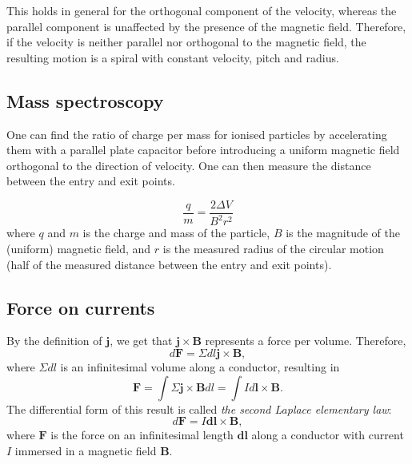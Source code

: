 \documentclass[a4paper, 12pt]{article}
\renewcommand{\vec}[1]{\mathbf{#1}}
\renewcommand{\j}{\ensuremath{\vec{j}}}
\newcommand{\B}{\ensuremath{\vec{B}}}
\begin{document}
        This holds in general for the orthogonal component of the velocity, whereas the parallel component is unaffected by the presence of the magnetic field. 
        Therefore, if the velocity is neither parallel nor orthogonal to the magnetic field, the resulting motion is a spiral with constant velocity, pitch and radius.
        
    \subsection{Mass spectroscopy}
        One can find the ratio of charge per mass for ionised particles by accelerating them with a parallel plate capacitor before introducing a uniform magnetic field orthogonal to the direction of velocity. One can then measure the distance between the entry and exit points.
        
        \begin{equation}
            \frac{q}{m} = \frac{2 \Delta V}{B^2 r^2}
        \end{equation}
        where $q$ and $m$ is the charge and mass of the particle, $B$ is the magnitude of the (uniform) magnetic field, and $r$ is the measured radius of the circular motion (half of the measured distance between the entry and exit points).
        
    \subsection{Force on currents}
        By the definition of \j, we get that $\j \times \B$ represents a force per volume. Therefore, 
        \begin{equation}
            d\vec{F} = \Sigma dl \j \times \B, 
        \end{equation}
        where $\Sigma dl$ is an infinitesimal volume along a conductor, resulting in 
        \begin{equation}
            \vec{F} = \int \Sigma \j \times \B dl = \int I d\vec{l} \times \B.
        \end{equation}
        The differential form of this result is called \textit{the second Laplace elementary law}:
        \begin{equation}
            d\vec{F} = I\vec{dl} \times \B,
        \end{equation}
        where $\vec{F}$ is the force on an infinitesimal length $\vec{dl}$ along a conductor with current $I$ immersed in a magnetic field $\B$.
        
\end{document}
